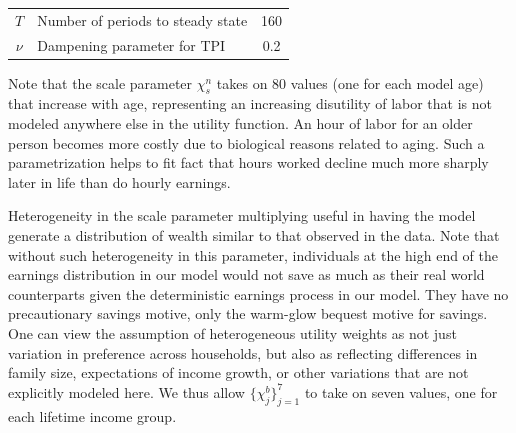 \documentclass[letterpaper,12pt]{article}
\theoremstyle{definition}
\begin{document}
\begin{spacing}{1.5}
\begin{table}[htbp]
\begin{threeparttable}
\begin{tabular}{>{\footnotesize}c |>{\footnotesize}l |>{\footnotesize}c}
        \hline
        $T$ & Number of periods to steady state & 160 \\
        $\nu$ & Dampening parameter for TPI & 0.2 \\
        \hline\hline
      \end{tabular}
      \end{threeparttable}
    \end{table}

   Note that the scale parameter $\chi^n_s$ takes on 80 values (one for each model age) that increase with age, representing an increasing disutility of labor that is not modeled anywhere else in the utility function. An hour of labor for an older person becomes more costly due to biological reasons related to aging. Such a parametrization helps to fit fact that hours worked decline much more sharply later in life than do hourly earnings.

   Heterogeneity in the scale parameter multiplying useful in having the model generate a distribution of wealth similar to that observed in the data.  Note that without such heterogeneity in this parameter, individuals at the high end of the earnings distribution in our model would not save as much as their real world counterparts given the deterministic earnings process in our model. They have no precautionary savings motive, only the warm-glow bequest motive for savings.  One can view the assumption of heterogeneous utility weights as not just variation in preference across households, but also as reflecting differences in family size, expectations of income growth, or other variations that are not explicitly modeled here.  We thus allow  $\{\chi^b_j\}_{j=1}^7$ to take on seven values, one for each lifetime income group.



\end{spacing}
\end{document}
